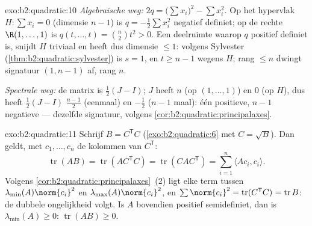 \begin{solution}{exo:b2:quadratic:10}
\emph{Algebraïsche weg:} $2q = \bigl(\sum x_i\bigr)^2 - \sum
x_i^2$. Op het hypervlak $H : \sum x_i = 0$ (dimensie $n - 1$) is
$q = -\frac12\sum x_i^2$ negatief definiet; op de rechte $\R(1,
\dots, 1)$ is $q(t, \dots, t) = \binom n2 t^2 > 0$. Een deelruimte
waarop $q$ positief definiet is, snijdt $H$ triviaal en heeft dus
dimensie $\leq 1$: volgens Sylvester
(\cref{thm:b2:quadratic:sylvester}) is $s = 1$, en $t \geq n-1$
wegens $H$; rang $\leq n$ dwingt signatuur $(1, n-1)$ af, rang $n$.

\emph{Spectrale weg:} de matrix is $\frac12(J - I)$; $J$ heeft
 $n$ (op $(1,\dots,1)$) en $0$ (op $H$), dus heeft
$\frac12(J-I)$  $\frac{n-1}{2}$ (eenmaal) en
$-\frac12$ ($n-1$ maal): één positieve, $n-1$ negatieve ---
dezelfde signatuur, volgens
\cref{cor:b2:quadratic:principalaxes}.
\end{solution}

\begin{solution}{exo:b2:quadratic:11}
Schrijf $B = C^{\mathsf T}C$ (\cref{exo:b2:quadratic:6} met $C =
\sqrt B$). Dan geldt, met $c_1, \dots, c_n$ de kolommen van
$C^{\mathsf T}$:
\[
\operatorname{tr}(AB) = \operatorname{tr}(AC^{\mathsf T}C)
= \operatorname{tr}(CAC^{\mathsf T})
= \sum_{i=1}^n \langle A c_i, c_i\rangle .
\]
Volgens \cref{cor:b2:quadratic:principalaxes}~(2) ligt elke term
tussen $\lambda_{\min}(A)\norm{c_i}^2$ en
$\lambda_{\max}(A)\norm{c_i}^2$, en $\sum\norm{c_i}^2 =
\operatorname{tr}(C^{\mathsf T}C)^{\vphantom1} =
\operatorname{tr} B$: de dubbele ongelijkheid volgt. Is $A$
bovendien positief semidefiniet, dan is $\lambda_{\min}(A) \geq 0$:
$\operatorname{tr}(AB) \geq 0$.
\end{solution}

